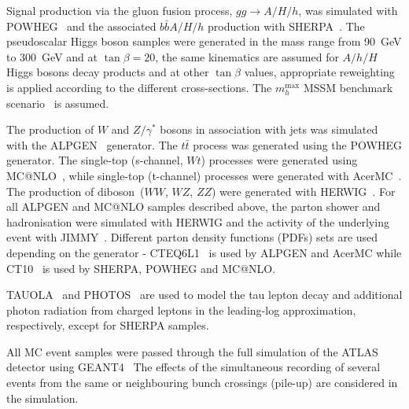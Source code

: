 Signal production via the gluon fusion process, $gg\rightarrow A/H/h$,
was simulated with POWHEG~\cite{POWHEG} and the associated
$b\bar{b}A/H/h$ production with SHERPA~\cite{SHERPA}.  The
pseudoscalar Higgs boson samples were generated in the mass range from
90~GeV to 300~GeV and at $\tan\beta = 20$, the same kinematics
are assumed for $A/h/H$ Higgs bosons decay products and at other
$\tan\beta$ values, appropriate reweighting is applied according to the
different cross-sections. The $m_h^{\mathrm{max}}$ MSSM benchmark
scenario~\cite{MSSMmhmax} is assumed.

The production of $W$ and $Z/\gamma^*$ bosons in association with jets
was simulated with the ALPGEN~\cite{Alpgen} generator. 
The $t\bar{t}$ process was generated using the POWHEG generator. The single-top (s-channel, $Wt$)
processes were generated using MC@NLO~\cite{MCatNLO}, while single-top
(t-channel) processes were generated with AcerMC~\cite{AcerMC}.  The
production of diboson~($WW$, $WZ$, $ZZ$) were generated with
HERWIG~\cite{Herwig}.  For all ALPGEN and MC@NLO samples described
above, the parton shower and hadronisation were simulated with HERWIG
and the activity of the underlying event with JIMMY~\cite{JIMMY}.
Different parton density functions (PDFs) sets are used depending on
the generator - CTEQ6L1~\cite{CTEQ6} is used by ALPGEN and AcerMC while
CT10~\cite{CT10} is used by SHERPA, POWHEG and MC@NLO. 

TAUOLA~\cite{TAUOLA} and PHOTOS~\cite{PHOTOS} are used to model the
tau lepton decay and additional photon radiation from charged leptons
in the leading-log approximation, respectively, except for SHERPA
samples.  

All MC event samples were passed through the full simulation
of the ATLAS detector using GEANT4~\cite{Geant4,ATLASSIM} 
The effects of the 
simultaneous recording of several events from the
same or neighbouring bunch crossings (pile-up) are considered in the
simulation. 

